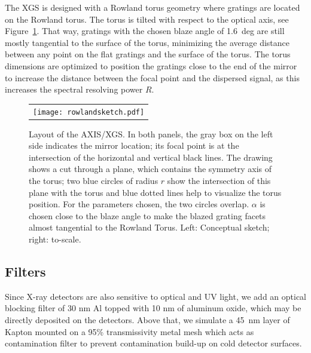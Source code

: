 \documentclass[12pt]{spieman}  %
\begin{document}
\begin{spacing}{1}
The XGS is designed with a Rowland torus
geometry\cite{beuermann:78} where gratings are located on the
Rowland torus. The torus is tilted with respect to the optical axis\cite{doi:10.1117/12.856482,doi:10.1117/12.2273011}, see Figure~\ref{fig:sketch}. That way, gratings with the chosen blaze angle of 1.6~deg are still mostly tangential to the surface of the torus, minimizing the average distance between any point on the flat gratings and the surface of the torus. The torus dimensions are optimized to position the gratings close to the end of the mirror to increase the distance between the focal point and the dispersed signal, as this increases the spectral resolving power $R$.

\begin{figure} [ht]
\begin{center}
\begin{tabular}{c} %
\texttt{[image: rowlandsketch.pdf]}
\end{tabular}
\end{center}
\caption {\label{fig:sketch}
Layout of the AXIS/XGS. In both panels, the gray box on the left side indicates the mirror location; its focal point is at the intersection of the horizontal and vertical black lines. The drawing shows a cut through a plane, which contains the symmetry axis of the torus; two blue circles of radius $r$ show the intersection of this plane with the torus and blue dotted lines help to visualize the torus position. For the parameters chosen, the two circles overlap. $\alpha$ is chosen close to the blaze angle to make the blazed grating facets almost tangential to the Rowland Torus. Left: Conceptual sketch; right: to-scale.
}
\end{figure}

\subsection{Filters}

Since X-ray detectors are also sensitive to optical and UV light, we add an optical blocking filter of 30 nm Al topped with 10 nm of aluminum oxide, which may be directly deposited on the detectors. Above that, we simulate a 45~nm layer of Kapton mounted on a 95\% transmissivity metal mesh which acts as contamination filter to prevent contamination build-up on cold detector surfaces.



\end{spacing}
\end{document}
